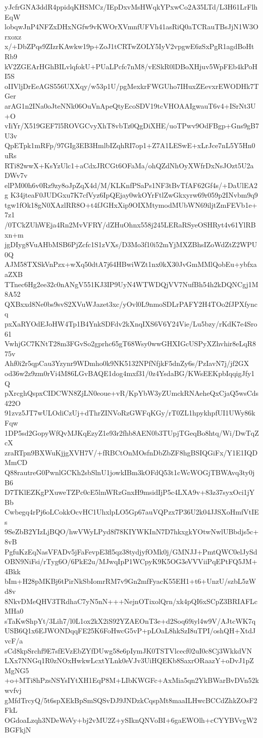 yJcfrGNA3ddR4ppidqKHSMCz/IEpDxvMsHWqkYPxwCo2A35LTd/L3H61LrFlhEqW
lobqwJnP4NFZxDHxNGfw9vKWOrXVmnfUFVh41asRiQ0aTCRauTBsJjN1W3Orxoxz
x/+DbZPqs9ZIzrKAwkw19p+ZoJ1tCRTwZOLY5IyV2vpgwE6zSxPgR1agdBoHtRb9
kV2ZGEArHGhBILvlqfokU+PUaLPcfc7nM8/vESkR0lDBoXHjuv5WpFEb4kPoHI5S
oIIVljDrEeAGS556UXXqy/w53p1U/pgMexkrFWGUho7IHuxZEevxrEWODHk7TGer
arAG1n2INa0oJteNNk06OuVnApeQtyEcoSDV19tcVHOAAIgwauT6v4+ISrNt3U+O
vIiYr/X519GEF7l5ROVGCvyXhT8vbTz0QgDiXHE/uoTPwv9OdFBgp+Gns9gB7U3v
QpETpk1mRFp/97GIg3EB3HmlbIZqhRI7op1+Z7A1LESwE+xLrJce7nL5Y5Hn0uRs
RTi82wwX+KsYzUlc1+aCdxJRCGt6OFaMa/ohQZdNhOyXWfrDxNsJOzt5U2aDWv7v
elPM00h6v0Rz9zy8oJpZqX4d/M/KLKnfPSaPs1NF3tBvTfAF62Gf4s/+DaUlEA2g
K34jteaF0JUDGxu7K7cfVyz6IpQEjay0wkOYrFtlZwGkxyrw69r059p2INvbm9q9
tgw1fOk18gN0XAzlRR8O+t4fJGHxXip9OIXMtymodMUbWN69iljtZmFEVb1e+7z1
/0TCkZUhWEja4Rn2MvVFRY/dZHuOhnx558j245LERaRSyeOSHRyt4v61YlRBxn+m
jgDIyg8VuAHbMSB6PjZcfc1S1zVXs/D3Mo3f10i52mYjMXZBhsIZoWdZtZ2WPU0Q
AJM58TXSkVnPzx+wXq50dtA7j64HBwiWZt1nx0kX30JvGmMMlQobEu+ybfxaaZXB
TTnec6Hg2ee32c0nANgV551KJ3IP9UyN4WTWDQjVV7NufBh54h2kDQNCgj1M8A52
QXBxxd8Ne0bs9svS2XVuWJazet3xc/yOvl0L9nmoSDLrPAFY2H4TOo2fJPXfyncq
pxXaRYOdEJoHW4Tp1B4YnkSDFdv2kXnqIXS6V6Y24Vie/Lu5bzy/rKdK7e4Sro61
VwhjGC7KNtT28m3FGvSo2gprhc65gT68Wsy0wwGHXIGcUSPyXZhvhir8eLqR875v
Ahf0i2r5qpCau3Yzynr9WDmho0k9NK5132NPfNfjkF5dnZy6s/PzIavN7j/jf2GX
od36w2z9zm0rVi4M86LGvBAQE1dog4mxf31/0z4YsdaBG/KWsEEKpbIqqigJfy1Q
pXrcghQspxCIDCWN8ZjLN0eoue+vR/KpYbW3yZUmckRNAeheQxCjaQ5wsCds422O
91zvz5JT7wULOdiCzUj+dThrZINVoRzGWFqKGy/rT0ZL1hpykhpfUI1UWy86kFqw
1DP5sd2GopyWfQvMJKqEzyZ1e93r2fhb8AEN0b3TUpjTGeqBo8htq/Wi/DwTqZcX
zraRTpn9BXWuKjjgXVH7V/+fRBCtOnMOsfnDbZbZF8hgBSIQGiFx/Y1E1IQDMmCD
Q88rautreG0PwnlGCKh2sbSlnU1jowkIBm3kOFdQ53t1cWcWOGjTBWAvq3ty0jB6
D7TKlEZKgPXuweTZPc0cE5lmWRzGnxH9msidIjP5c4LXA9v+83z37syxOci1jYBb
Cwbegq4rPj6oLCokkOcvHC1UhxlpLO5Gp67auVQPzx7P36U2k04JJSXoHmfVtIEs
9SeZbB2YIzLjBQO/hwVWyLPyd8f78KIYWKInN7D7hkxgkYOtwNwlUBbdjs5c+8vB
PgfuKzEqNasVFADv5jFaFevpE3fl5qz38tydjyfOMk0j/GMNJJ+PmtQWC0elJySd
OBN9NiFsi/rTyg6O/6PkE2u/MJwqIpP1WCpyK9K5OG3eVVViiPqEPtFQ5JM+4Bkk
bIm+H28pMKBj6tPirNkSbIomrRM7v9Gn2mfFyacK55EH1+t6+UnzU/szbL5zWd8v
8NkvDMeQHV3TRdhaC7yN5nN+++NejnOTixolQrn/xk4pQI6xSCpZ3BRIAFLcMHa0
sTaKwShpYt/3Lih7/l0L1ox2kX2iS92YZAEOnT3e+d2Soq69iyl4w9V/AJtcWK7q
USB6Q1x6EJWONDqqFE25K6FoHwcG5vP+pLOaL8hkSzI8uTPI/oshQH+XtdJvcF/a
sCd8kpSrchf9E7sfEVzEbZYfDUwg58e6pIymJK0TSTVlcecf02uI0c8Cj3WkkdVN
LXx7NNGq1R0zNOxHwkwLcxtYLnk0eVJv3UiHQEKb8SaxrORaazY+oDvJ1pZMgNG5
+o+MTi8hPzsNSYsIYtXH1EqP8M+LIbKWGFc+AxMia5qn2YkBWarBvDVn52kwvfvj
gMfdTrcyQ/5t6spXEkBpSmSQSvDJ9JNDzkCqspMt8maaILHwcBCCdZhkZOsF2FkL
OGdoaLzqh3NDeWeVy+bj2vMU2Z+ySIknQNVoBI+6gaEWOlh+cCYYBVvgW2BGFkjN
